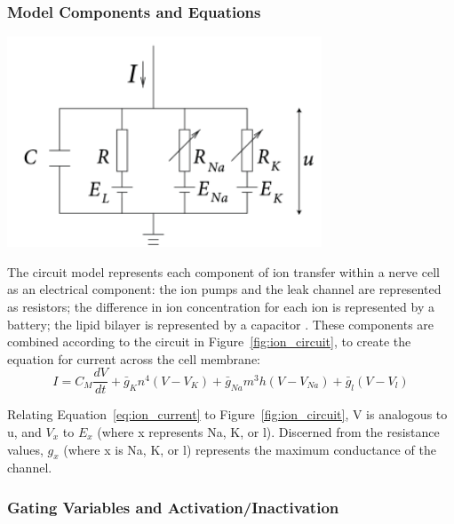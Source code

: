 \documentclass{article} %
\begin{document}
\begin{multicols}{2}
\subsubsection{Model Components and Equations}
\label{subsubsec:hh_equations}

\begin{minipage}{\linewidth}
    \centering
    \includegraphics[width=0.9\linewidth]{Figs/ion_circuit.png}
    \label{fig:ion_circuit}
\end{minipage}

The circuit model represents each component of ion transfer within a nerve cell as an electrical component: 
the ion pumps and the leak channel are represented as resistors; the difference in ion concentration for each ion is represented by a battery; the lipid bilayer is represented by a capacitor \cite{Gerstner2014}.
These components are combined according to the circuit in Figure~\ref{fig:ion_circuit}, to create the equation for current across the cell membrane:
\begin{dmath}
    I = C_{M}\frac{dV}{dt} + \bar{g}_{K}n^4(V - V_{K}) + \bar{g}_{Na}m^3h(V - V_{Na}) + \bar{g}_{l}(V - V_{l})
    \label{eq:ion_current}
\end{dmath}

Relating Equation~\ref{eq:ion_current} to Figure~\ref{fig:ion_circuit}, V is analogous to u, and $V_x$ to $E_x$ (where x represents Na, K, or l). Discerned from the resistance values, $g_x$ (where x is Na, K, or l) represents the maximum conductance of the channel.

\subsubsection{Gating Variables and Activation/Inactivation}
\label{subsubsec:gating_variables}


\end{multicols}
\end{document}

